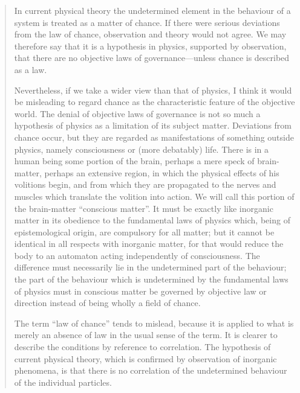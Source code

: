 \documentclass{article}
\begin{document}
\begin{quote}
    In current physical theory the undetermined element in the behaviour of a system is treated as a matter of chance.  If there were serious deviations from the law of chance, observation and theory would not agree.  We may therefore say that it is a hypothesis in physics, supported by observation, that there are no objective laws of governance---unless chance is described as a law.

    Nevertheless, if we take a wider view than that of physics, I think it would be misleading to regard chance as the characteristic feature of the objective world.  The denial of objective laws of governance is not so much a hypothesis of physics as a limitation of its subject matter.  Deviations from chance occur, but they are regarded as manifestations of something outside physics, namely consciousness or (more debatably) life.  There is in a human being some portion of the brain, perhaps a mere speck of brain-matter, perhaps an extensive region, in which the physical effects of his volitions begin, and from which they are propagated to the nerves and muscles which translate the volition into action.  We will call this portion of the brain-matter ``conscious matter''.  It must be exactly like inorganic matter in its obedience to the fundamental laws of physics which, being of epistemological origin, are compulsory for all matter; but it cannot be identical in all respects with inorganic matter, for that would reduce the body to an automaton acting independently of consciousness.  The difference must necessarily lie in the undetermined part of the behaviour; the part of the behaviour which is undetermined by the fundamental laws of physics must in conscious matter be governed by objective law or direction instead of being wholly a field of chance.  

    The term ``law of chance'' tends to mislead, because it is applied to what is merely an absence of law in the usual sense of the term.  It is clearer to describe the conditions by reference to correlation.  The hypothesis of current physical theory, which is confirmed by observation of inorganic phenomena, is that there is no correlation of the undetermined behaviour of the individual particles.  


\end{quote}
\end{document}
